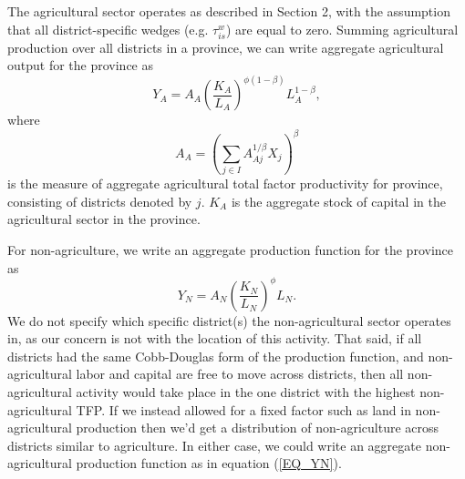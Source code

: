 \documentclass[11pt]{article}
\begin{document}
The agricultural sector operates as described in Section 2, with the assumption that all district-specific wedges (e.g. $\tau^w_{is}$) are equal to zero. Summing agricultural production over all districts in a province, we can write aggregate agricultural output for the province as
\begin{equation}
    Y_A = A_A \left(\frac{K_A}{L_A}\right)^{\phi(1-\beta)} L_A^{1-\beta}, \label{EQ_caL_solve}
\end{equation}
where 
\begin{equation}
    A_A = \left(\sum_{j\in I} A_{Aj}^{1/\beta}X_{j} \right)^\beta \nonumber
\end{equation}
is the measure of aggregate agricultural total factor productivity for province, consisting of districts denoted by $j$. $K_A$ is the aggregate stock of capital in the agricultural sector in the province. 

For non-agriculture, we write an aggregate production function for the province as
\begin{equation}
    Y_N = A_N \left(\frac{K_N}{L_N}\right)^{\phi} L_N. \label{EQ_YN}
\end{equation}
We do not specify which specific district(s) the non-agricultural sector operates in, as our concern is not with the location of this activity. That said, if all districts had the same Cobb-Douglas form of the production function, and non-agricultural labor and capital are free to move across districts, then all non-agricultural activity would take place in the one district with the highest non-agricultural TFP. If we instead allowed for a fixed factor such as land in non-agricultural production then we'd get a distribution of non-agriculture across districts similar to agriculture. In either case, we could write an aggregate non-agricultural production function as in equation (\ref{EQ_YN}).
\end{document}
